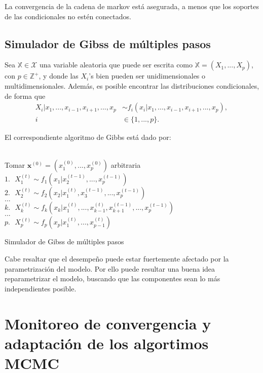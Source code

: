 La convergencia de la cadena de markov está asegurada, a menos que los soportes de las condicionales no estén conectados.

\subsection{Simulador de Gibss de múltiples pasos}

Sea $\mathbb{X} \in \mathcal{X}$ una variable aleatoria que puede ser escrita como $\mathbb{X} = (X_1,...,X_p)$, con $p \in \mathbb{Z}^+$, y donde las $X_i$'s bien pueden ser unidimensionales o multidimensionales. Además, es posible encontrar las distribuciones condicionales, de forma que
\begin{equation*}
\begin{aligned}
X_i|x_1,...,x_{i-1},x_{i+1},...,x_p &\sim f_i(x_i|x_1,...,x_{i-1},x_{i+1},...,x_p) \text{, }\\
i &\in \{1,...,p\}.
\end{aligned}
\end{equation*}

El correspondiente algoritmo de Gibbs está dado por:
\\ \\
\begin{algorithm}[H]
 Tomar $\textbf{x}^{(0)} = (x_1^{(0)},...,x_p^{(0)})$ arbitraria\;
 {
    $1. \text{ } X_1^{(t)} \sim f_1(x_1|x_2^{(t-1)},...,x_p^{(t-1)})\;$\\
    $2. \text{ } X_2^{(t)} \sim f_2(x_2|x_1^{(t)},x_3^{(t-1)},...,x_p^{(t-1)})\;$\\
    $...\;$\\
    $k.  \text{ } X_k^{(t)} \sim f_k(x_k|x_1^{(t)},...,x_{k-1}^{(t)},x_{k+1}^{(t-1)},...,x_p^{(t-1)})\;$\\
    $...\;$\\
    $p.  \text{ }X_p^{(t)} \sim f_p(x_p|x_1^{(t)},...,x_{p-1}^{(t)})\;$\\
 }
 \caption{Simulador de Gibss de múltiples pasos}
\end{algorithm}
\BlankLine

Cabe resaltar que el desempeño puede estar fuertemente afectado por la parametrización del modelo. Por ello puede resultar una buena idea reparametrizar el modelo, buscando que las componentes sean lo más independientes posible.

\section {Monitoreo de convergencia y adaptación de los algortimos MCMC}

